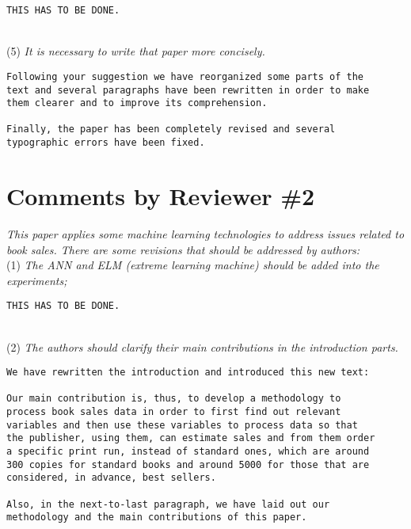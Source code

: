 \documentclass[preprint]{elsarticle}
\begin{document}
\begin{verbatim}
THIS HAS TO BE DONE.
\end{verbatim}

~\\
\noindent (5) \emph{It is necessary to write that paper more concisely. } 

\begin{verbatim}
Following your suggestion we have reorganized some parts of the 
text and several paragraphs have been rewritten in order to make 
them clearer and to improve its comprehension.

Finally, the paper has been completely revised and several 
typographic errors have been fixed.
\end{verbatim}



\section{Comments by Reviewer \#2}

\noindent \emph{This paper applies some machine learning technologies to address issues related to book sales. There are some revisions that should be addressed by authors: } \\


\noindent (1) \emph{The ANN and ELM (extreme learning machine) should be added into the experiments; } 

\begin{verbatim}
THIS HAS TO BE DONE.
\end{verbatim}

~\\
\noindent (2) \emph{The authors should clarify their main contributions in the introduction parts.}

\begin{verbatim}
We have rewritten the introduction and introduced this new text:

Our main contribution is, thus, to develop a methodology to 
process book sales data in order to first find out relevant 
variables and then use these variables to process data so that 
the publisher, using them, can estimate sales and from them order 
a specific print run, instead of standard ones, which are around 
300 copies for standard books and around 5000 for those that are 
considered, in advance, best sellers.

Also, in the next-to-last paragraph, we have laid out our 
methodology and the main contributions of this paper.
\end{verbatim}
\end{document}
